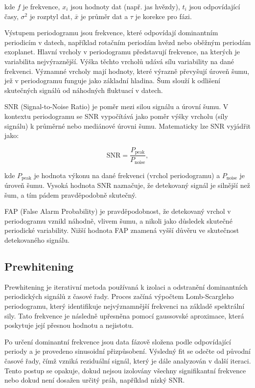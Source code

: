 \documentclass[a4paper,11pt,twocolumn]{article}
\begin{document}
            kde $f$ je frekvence, $x_i$ jsou hodnoty dat (např. jas hvězdy), $t_i$ jsou odpovídající časy, $\sigma^2$ je rozptyl dat, $\bar{x}$ je průměr dat a $\tau$  je korekce pro fázi.
                
            Výstupem periodogramu jsou frekvence, které odpovídají dominantním periodicím v datech, například rotačním periodám hvězd nebo oběžným periodám exoplanet. Hlavní vrcholy v periodogramu představují frekvence, na kterých je variabilita nejvýraznější. Výška těchto vrcholů udává sílu variability na dané frekvenci. Významné vrcholy mají hodnoty, které výrazně převyšují úroveň šumu, jež v periodogramu funguje jako základní hladina. Šum slouží k odlišení skutečných signálů od náhodných fluktuací v datech.

            SNR (Signal-to-Noise Ratio) je poměr mezi silou signálu a úrovní šumu. V kontextu periodogramu se SNR vypočítává jako poměr výšky vrcholu (síly signálu) k průměrné nebo mediánové úrovni šumu. Matematicky lze SNR vyjádřit jako:

            \begin{equation*}
                \text{SNR} = \frac{P_{\text{peak}}}{P_{\text{noise}}},
            \end{equation*}

            kde $P_{\text{peak}}$ je hodnota výkonu na dané frekvenci (vrchol periodogramu) a $P_{\text{noise}}$ je úroveň šumu. Vysoká hodnota SNR naznačuje, že detekovaný signál je silnější než šum, a tím pádem pravděpodobně skutečný.

            FAP (False Alarm Probability) je pravděpodobnost, že detekovaný vrchol v periodogramu vznikl náhodně, vlivem šumu, a nikoli jako důsledek skutečné periodické variability. Nižší hodnota FAP znamená vyšší důvěru ve skutečnost detekovaného signálu.

        \subsection{Prewhitening}
            Prewhitening je iterativní metoda používaná k izolaci a odstranění dominantních periodických signálů z časové řady. Proces začíná výpočtem Lomb-Scargleho periodogramu, který identifikuje nejvýznamnější frekvenci na základě spektrální sily. Tato frekvence je následně upřesněna pomocí gaussovské aproximace, která poskytuje její přesnou hodnotu a nejistotu.

            Po určení dominantní frekvence jsou data fázově složena podle odpovídající periody a je provedeno sinusoidní přizpůsobení. Výsledný fit se odečte od původní časové řady, čímž vzniká reziduální signál, který je dále analyzován v další iteraci. Tento postup se opakuje, dokud nejsou izolovány všechny signifikantní frekvence nebo dokud není dosažen určitý práh, například nízký SNR.
\end{document}
